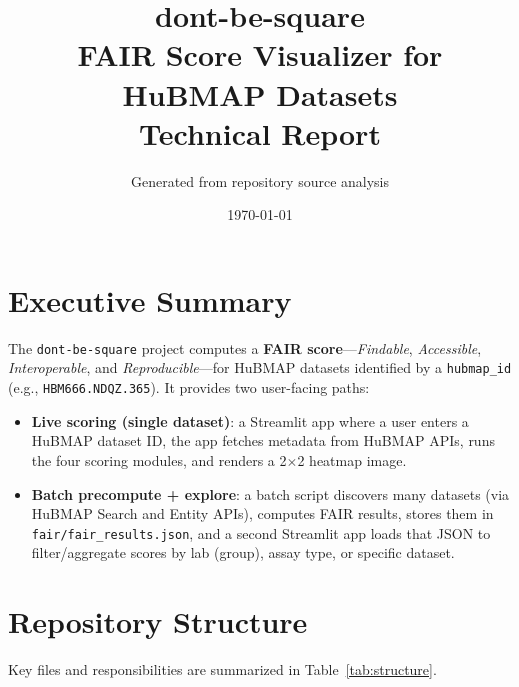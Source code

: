 \documentclass[11pt]{article}
\title{\textbf{dont-be-square}\\FAIR Score Visualizer for HuBMAP Datasets\\\large Technical Report}
\author{Generated from repository source analysis}
\date{\today}
\begin{document}
\maketitle
\tableofcontents
\newpage

\section{Executive Summary}
The \texttt{dont-be-square} project computes a \textbf{FAIR score}---\textit{Findable}, \textit{Accessible}, \textit{Interoperable}, and \textit{Reproducible}---for HuBMAP datasets identified by a \texttt{hubmap\_id} (e.g., \texttt{HBM666.NDQZ.365}). It provides two user-facing paths:
\begin{itemize}[leftmargin=2em]
  \item \textbf{Live scoring (single dataset)}: a Streamlit app where a user enters a HuBMAP dataset ID, the app fetches metadata from HuBMAP APIs, runs the four scoring modules, and renders a 2$\times$2 heatmap image.
  \item \textbf{Batch precompute + explore}: a batch script discovers many datasets (via HuBMAP Search and Entity APIs), computes FAIR results, stores them in \texttt{fair/fair\_results.json}, and a second Streamlit app loads that JSON to filter/aggregate scores by lab (group), assay type, or specific dataset.
\end{itemize}

\section{Repository Structure}
Key files and responsibilities are summarized in Table~\ref{tab:structure}.
\end{document}
